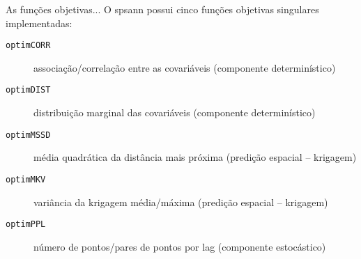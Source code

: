 As funções objetivas... 
O spsann possui cinco funções objetivas singulares implementadas:

\begin{description}
\item [\verb|optimCORR|] associação/correlação entre as covariáveis
      (componente determinístico)
\item [\verb|optimDIST|] distribuição marginal das covariáveis 
      (componente determinístico)
\item [\verb|optimMSSD|] média quadrática da distância mais próxima
      (predição espacial – krigagem)
\item [\verb|optimMKV|] variância da krigagem média/máxima (predição
      espacial – krigagem)
\item [\verb|optimPPL|] número de pontos/pares de pontos por lag 
      (componente estocástico)
\end{description}

